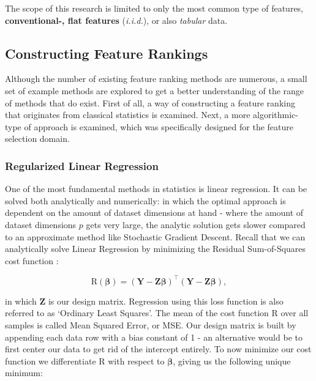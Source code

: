 \documentclass[../main.tex]{subfiles}
\begin{document}
The scope of this research is limited to only the most common type of features, \textbf{conventional-, flat features} (\textit{i.i.d.}), or also \textit{tabular} data.



\subsection{Constructing Feature Rankings}
Although the number of existing feature ranking methods are numerous, a small set of example methods are explored to get a better understanding of the range of methods that do exist. First of all, a way of constructing a feature ranking that originates from classical statistics is examined. Next, a more algorithmic-type of approach is examined, which was specifically designed for the feature selection domain.



\subsubsection{Regularized Linear Regression}\label{section:ridge-regression}
One of the most fundamental methods in statistics is linear regression. It can be solved both analytically and numerically: in which the optimal approach is dependent on the amount of dataset dimensions at hand - where the amount of dataset dimensions $p$ gets very large, the analytic solution gets slower compared to an approximate method like Stochastic Gradient Descent. Recall that we can analytically solve Linear Regression by minimizing the Residual Sum-of-Squares cost function \citep{hastie_elements_2009}:

\begin{equation}\text{R}(\boldsymbol{\beta}) = (\mathbf{Y} - \mathbf{Z} \boldsymbol{\beta})^\intercal (\mathbf{Y} - \mathbf{Z} \boldsymbol{\beta}),\end{equation}

in which $\mathbf{Z}$ is our design matrix. Regression using this loss function is also referred to as `Ordinary Least Squares'. The mean of the cost function $\text{R}$ over all samples is called Mean Squared Error, or MSE. Our design matrix is built by appending each data row with a bias constant of 1 - an alternative would be to first center our data to get rid of the intercept entirely. To now minimize our cost function we differentiate $\text{R}$ with respect to $\boldsymbol{\beta}$, giving us the following unique minimum:
\end{document}
